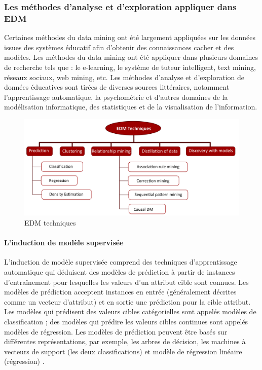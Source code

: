     \subsubsection{Les méthodes d’analyse et d’exploration appliquer dans EDM}
    Certaines méthodes du data mining ont été largement appliquées sur les données issues des systèmes éducatif 
    afin d’obtenir des connaissances cacher et des modèles. Les méthodes du data mining ont été appliquer dans 
    plusieurs domaines de recherche tels que : le e-learning, le système de tuteur intelligent, text mining, 
    réseaux sociaux, web mining, etc. Les méthodes d’analyse et d'exploration de données éducatives sont 
    tirées de diverses sources littéraires, notamment l'apprentissage automatique, la psychométrie et d'autres 
    domaines de la modélisation informatique, des statistiques et de la visualisation de l'information. \\

    \begin{figure}[H]
		\begin{center}
			\includegraphics[width=\textwidth]{images/chapitre1/edm techniques}
		\end{center}
		\caption{EDM techniques}
    \end{figure}

    \paragraph{L'induction de modèle supervisée}

    L'induction de modèle supervisée comprend des techniques d'apprentissage automatique qui déduisent des modèles de prédiction à partir de instances d'entraînement pour lesquelles les valeurs d'un attribut cible sont connues. Les modèles de prédiction acceptent
    instances en entrée (généralement décrites comme un vecteur d'attribut) et en sortie une prédiction pour la cible attribut. Les modèles qui prédisent des valeurs cibles catégorielles sont appelés modèles de classification ; des modèles qui prédire les valeurs cibles continues sont appelés modèles de régression. Les modèles de prédiction peuvent être basés sur
    différentes représentations, par exemple, les arbres de décision, les machines à vecteurs de support (les deux classifications) et modèle de régression linéaire (régression) \cite{Scheuer2012}.

